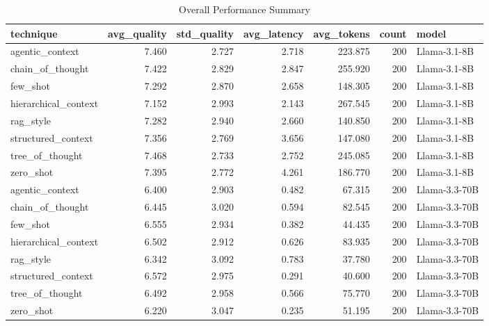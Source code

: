 \begin{table}
\caption{Overall Performance Summary}
\begin{tabular}{lrrrrrl}
\toprule
technique & avg_quality & std_quality & avg_latency & avg_tokens & count & model \\
\midrule
agentic_context & 7.460 & 2.727 & 2.718 & 223.875 & 200 & Llama-3.1-8B \\
chain_of_thought & 7.422 & 2.829 & 2.847 & 255.920 & 200 & Llama-3.1-8B \\
few_shot & 7.292 & 2.870 & 2.658 & 148.305 & 200 & Llama-3.1-8B \\
hierarchical_context & 7.152 & 2.993 & 2.143 & 267.545 & 200 & Llama-3.1-8B \\
rag_style & 7.282 & 2.940 & 2.660 & 140.850 & 200 & Llama-3.1-8B \\
structured_context & 7.356 & 2.769 & 3.656 & 147.080 & 200 & Llama-3.1-8B \\
tree_of_thought & 7.468 & 2.733 & 2.752 & 245.085 & 200 & Llama-3.1-8B \\
zero_shot & 7.395 & 2.772 & 4.261 & 186.770 & 200 & Llama-3.1-8B \\
agentic_context & 6.400 & 2.903 & 0.482 & 67.315 & 200 & Llama-3.3-70B \\
chain_of_thought & 6.445 & 3.020 & 0.594 & 82.545 & 200 & Llama-3.3-70B \\
few_shot & 6.555 & 2.934 & 0.382 & 44.435 & 200 & Llama-3.3-70B \\
hierarchical_context & 6.502 & 2.912 & 0.626 & 83.935 & 200 & Llama-3.3-70B \\
rag_style & 6.342 & 3.092 & 0.783 & 37.780 & 200 & Llama-3.3-70B \\
structured_context & 6.572 & 2.975 & 0.291 & 40.600 & 200 & Llama-3.3-70B \\
tree_of_thought & 6.492 & 2.958 & 0.566 & 75.770 & 200 & Llama-3.3-70B \\
zero_shot & 6.220 & 3.047 & 0.235 & 51.195 & 200 & Llama-3.3-70B \\
\bottomrule
\end{tabular}
\end{table}
